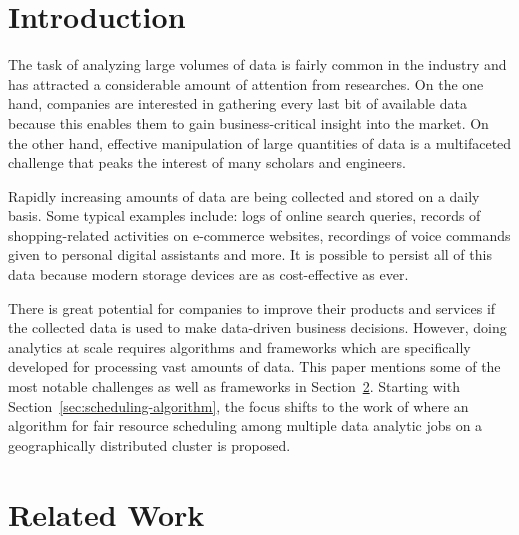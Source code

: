 
\theoremstyle{definition}
\newtheorem{definition}{Definition}[section]

\theoremstyle{definition}
\newtheorem{optimization}{Optimization Problem}

\section{Introduction}

The task of analyzing large volumes of data is fairly common in the industry and has attracted a considerable amount of attention from researches. On the one hand, companies are interested in gathering every last bit of available data because this enables them to gain business-critical insight into the market. On the other hand, effective manipulation of large quantities of data is a multifaceted challenge that peaks the interest of many scholars and engineers.

Rapidly increasing amounts of data are being collected and stored on a daily basis. Some typical examples include: logs of online search queries, records of shopping-related activities on e-commerce websites, recordings of voice commands given to personal digital assistants and more. It is possible to persist all of this data because modern storage devices are as cost-effective as ever.

There is great potential for companies to improve their products and services if the collected data is used to make data-driven business decisions. However, doing analytics at scale requires algorithms and frameworks which are specifically developed for processing vast amounts of data. This paper mentions some of the most notable challenges as well as frameworks in Section~\ref{sec:related-work}. Starting with Section~\ref{sec:scheduling-algorithm}, the focus shifts to the work of \citet{Chen2017} where an algorithm for fair resource scheduling among multiple data analytic jobs on a geographically distributed cluster is proposed.

\section{Related Work}
\label{sec:related-work}

